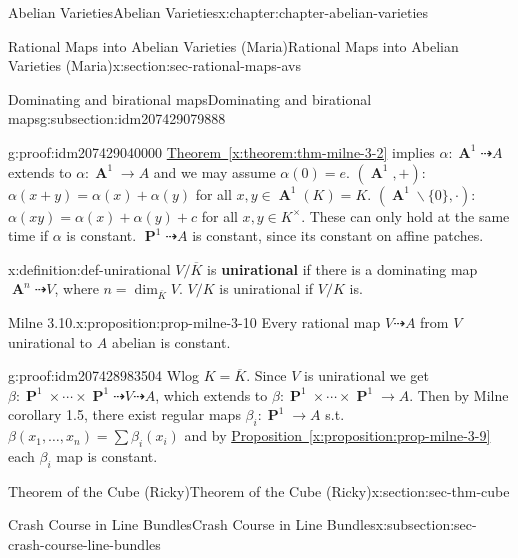 \documentclass[oneside,10pt,]{book}
\newcommand{\terminology}[1]{\textbf{#1}}
\numberwithin{equation}{section}
\DeclareMathOperator{\aff}{\mathbf{A}}
\DeclareMathOperator{\PP}{\mathbf{P}}
\begin{document}
\begin{chapterptx}{Abelian Varieties}{}{Abelian Varieties}{}{}{x:chapter:chapter-abelian-varieties}
\begin{sectionptx}{Rational Maps into Abelian Varieties (Maria)}{}{Rational Maps into Abelian Varieties (Maria)}{}{}{x:section:sec-rational-maps-avs}
\begin{subsectionptx}{Dominating and birational maps}{}{Dominating and birational maps}{}{}{g:subsection:idm207429079888}
\begin{proofptx}{}{g:proof:idm207429040000}
\hyperref[x:theorem:thm-milne-3-2]{Theorem~\ref{x:theorem:thm-milne-3-2}} implies \(\alpha \colon \aff^1 \dashrightarrow A\) extends to \(\alpha \colon \aff^1\to A\) and we may assume \(\alpha(0) = e\). \((\aff^1, +)\): \(\alpha(x+y) = \alpha(x) + \alpha(y)\) for all \(x,y\in \aff^1(K) = K\). \((\aff^1\smallsetminus\{0\}, \cdot)\): \(\alpha(xy) = \alpha(x) + \alpha(y) + c\) for all \(x,y\in K^\times\). These can only hold at the same time if \(\alpha\) is constant. \(\PP^1 \dashrightarrow A\) is constant, since its constant on affine patches.%
\end{proofptx}
\begin{definition}{}{x:definition:def-unirational}%
\(V/\overline K\) is \terminology{unirational} if there is a dominating map \(\aff^n \dashrightarrow V\), where \(n = \dim_{\overline K} V\). \(V/K\) is unirational if \(V/K\) is.%
\end{definition}
\begin{proposition}{Milne 3.10.}{}{x:proposition:prop-milne-3-10}%
Every rational map \(V\dashrightarrow A\) from \(V\) unirational to \(A\) abelian is constant.%
\end{proposition}
\begin{proofptx}{}{g:proof:idm207428983504}
Wlog \(K = \overline K\). Since \(V\) is unirational we get \(\beta \colon \PP^1\times\cdots\times\PP^1 \dashrightarrow V\dashrightarrow A\), which extends to \(\beta \colon \PP^1\times\cdots\times\PP^1 \to A\). Then by Milne corollary 1.5, there exist regular maps \(\beta_i \colon \PP^1 \to A\) s.t. \(\beta(x_1,\ldots, x_n) = \sum \beta_i(x_i)\) and by \hyperref[x:proposition:prop-milne-3-9]{Proposition~\ref{x:proposition:prop-milne-3-9}} each \(\beta_i\) map is constant.%
\end{proofptx}
\end{subsectionptx}
\end{sectionptx}
%
%
\typeout{************************************************}
\typeout{************************************************}
%
\begin{sectionptx}{Theorem of the Cube (Ricky)}{}{Theorem of the Cube (Ricky)}{}{}{x:section:sec-thm-cube}
%
%
\typeout{************************************************}
\typeout{************************************************}
%
\begin{subsectionptx}{Crash Course in Line Bundles}{}{Crash Course in Line Bundles}{}{}{x:subsection:sec-crash-course-line-bundles}

\end{subsectionptx}
\end{sectionptx}
\end{chapterptx}
\end{document}
